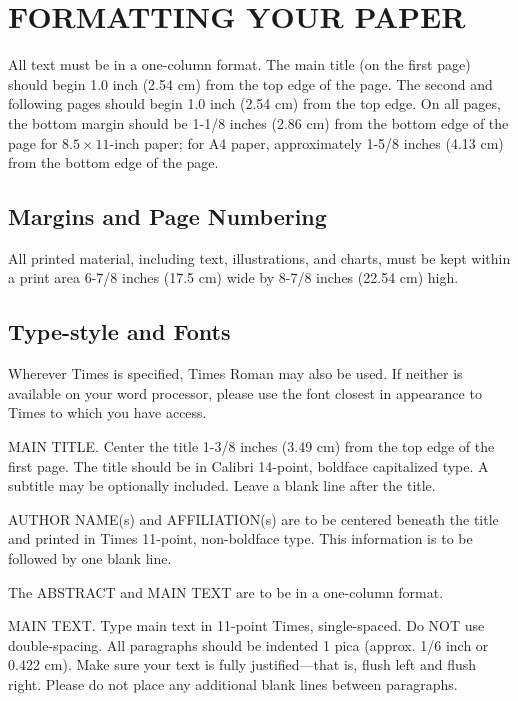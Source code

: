 {%
\section{FORMATTING YOUR PAPER}

All text must be in a one-column format. The main title (on the first page) should begin 1.0 inch (2.54 cm) from the top edge of the page. The second and following pages should begin 1.0 inch (2.54 cm) from the top edge. On all pages, the bottom margin should be 1-1/8 inches (2.86 cm) from the bottom edge of the page for $8.5 \times 11$-inch paper; for A4 paper, approximately 1-5/8 inches (4.13 cm) from the bottom edge of the page.

\subsection{Margins and Page Numbering}

All printed material, including text, illustrations, and charts, must be kept within a print area 6-7/8 inches (17.5 cm) wide by 8-7/8 inches (22.54 cm) high.

\subsection{Type-style and Fonts}

Wherever Times is specified, Times Roman may also be used. If neither is available on your word processor, please use the font closest in appearance to Times to which you have access.

MAIN TITLE. Center the title 1-3/8 inches (3.49 cm) from the top edge of the first page. The title should be in Calibri 14-point, boldface capitalized type. A subtitle may be optionally included. Leave a blank line after the title.

AUTHOR NAME(s) and AFFILIATION(s) are to be centered beneath the title and printed in Times 11-point, non-boldface type. This information is to be followed by one blank line.

The ABSTRACT and MAIN TEXT are to be in a one-column format.

MAIN TEXT. Type main text in 11-point Times, single-spaced. Do NOT use double-spacing. All paragraphs should be indented 1 pica (approx. 1/6 inch or 0.422 cm). Make sure your text is fully justified---that is, flush left and flush right. Please do not place any additional blank lines between paragraphs.

}
